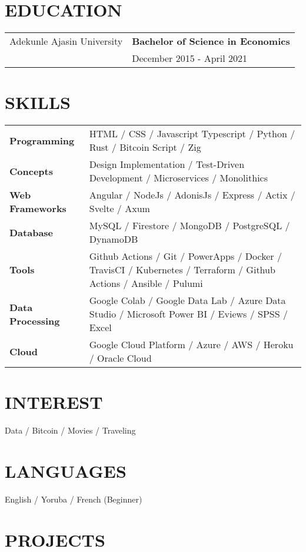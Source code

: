 \documentclass[a4paper,12pt]{article}
\begin{document}
\section{EDUCATION}

\begin{tabularx}{\linewidth}{@{}l X@{}}
Adekunle Ajasin University & \textbf{Bachelor of Science in Economics} \\
                          & December 2015 - April 2021 \\[10pt]
\end{tabularx}

\section{SKILLS}

\begin{tabularx}{\linewidth}{@{}l X@{}}
\textbf{Programming} & HTML / CSS / Javascript Typescript / Python / Rust / Bitcoin Script / Zig \\
\textbf{Concepts} & Design Implementation / Test-Driven Development / Microservices / Monolithics \\
\textbf{Web Frameworks} & Angular / NodeJs / AdonisJs / Express / Actix / Svelte / Axum \\
\textbf{Database} & MySQL / Firestore / MongoDB / PostgreSQL / DynamoDB \\
\textbf{Tools} & Github Actions / Git / PowerApps / Docker / TravisCI / Kubernetes / Terraform / Github Actions / Ansible / Pulumi  \\
\textbf{Data Processing} & Google Colab / Google Data Lab / Azure Data Studio / Microsoft Power BI / Eviews / SPSS / Excel \\
\textbf{Cloud} & Google Cloud Platform / Azure / AWS / Heroku / Oracle Cloud
\end{tabularx}

\section{INTEREST}
Data / Bitcoin / Movies / Traveling

\section{LANGUAGES}
English / Yoruba / French (Beginner)

\section{PROJECTS}
\end{document}
